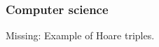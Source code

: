 \subsubsection{Computer science}

\begin{publictodo}
    Missing: Example of Hoare triples.
\end{publictodo}


